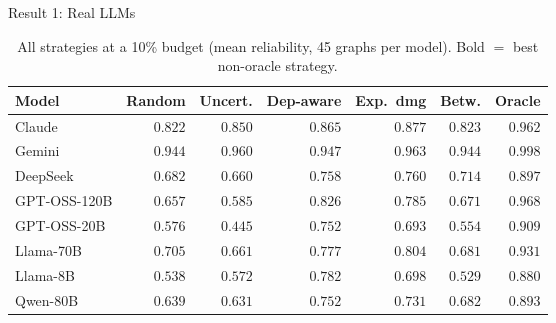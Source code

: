\documentclass[final]{beamer}
\newlength{\sepwidth}
\newlength{\colwidth}
\newcommand{\separatorcolumn}{\begin{column}{\sepwidth}\end{column}}
\begin{document}
\begin{frame}[t]
\begin{columns}[t]
\begin{column}{\colwidth}
\begin{block}{Result 1: Real LLMs}
    \begin{table}\centering\small
      \caption{All strategies at a 10\% budget (mean reliability, 45 graphs per model). Bold $=$ best non-oracle strategy.}
      \vspace{-0.5em}
      \setlength{\tabcolsep}{11pt}
      \begin{tabular}{lrrrrrr}
        \toprule
        \textbf{Model} & \textbf{Random} & \textbf{Uncert.} & \textbf{Dep-aware} & \textbf{Exp.\ dmg} & \textbf{Betw.} & \textbf{Oracle} \\
        \midrule
        Claude       & $0.822$ & $0.850$ & $0.865$ & $\mathbf{0.877}$ & $0.823$ & $0.962$ \\
        Gemini       & $0.944$ & $0.960$ & $0.947$ & $\mathbf{0.963}$ & $0.944$ & $0.998$ \\
        DeepSeek     & $0.682$ & $0.660$ & $0.758$ & $\mathbf{0.760}$ & $0.714$ & $0.897$ \\
        GPT-OSS-120B & $0.657$ & $0.585$ & $\mathbf{0.826}$ & $0.785$ & $0.671$ & $0.968$ \\
        GPT-OSS-20B  & $0.576$ & $0.445$ & $\mathbf{0.752}$ & $0.693$ & $0.554$ & $0.909$ \\
        Llama-70B    & $0.705$ & $0.661$ & $0.777$ & $\mathbf{0.804}$ & $0.681$ & $0.931$ \\
        Llama-8B     & $0.538$ & $0.572$ & $\mathbf{0.782}$ & $0.698$ & $0.529$ & $0.880$ \\
        Qwen-80B     & $0.639$ & $0.631$ & $\mathbf{0.752}$ & $0.731$ & $0.682$ & $0.893$ \\
        \bottomrule
      \end{tabular}
    \end{table}
  \end{block}

\end{column}

\separatorcolumn

\begin{column}{\colwidth}


\end{column}
\end{columns}
\end{frame}
\end{document}
